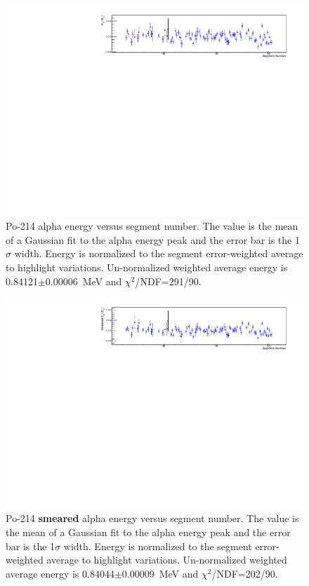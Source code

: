 \begin{figure}[!h]
\centering
\includegraphics[width=1.05\textwidth]{figures/PubBiPo214EvsCell.pdf}
\caption{\label{fig:EvsCell214}Po-214 alpha energy versus segment number. The value is the mean of a Gaussian fit to the alpha energy peak and the error bar is the 1$\sigma$ width. Energy is normalized to the segment error-weighted average to highlight variations. Un-normalized weighted average energy is 0.84121$\pm$0.00006~MeV and $\chi^2$/NDF=291/90.} 
\end{figure}
\begin{figure}[!h]
\centering
\includegraphics[width=1.05\textwidth]{figures/PubBiPo214EsmearvsCell.pdf}
\caption{\label{fig:EsmearvsCell214}Po-214 {\bf smeared} alpha energy versus segment number. The value is the mean of a Gaussian fit to the alpha energy peak and the error bar is the 1$\sigma$ width. Energy is normalized to the segment error-weighted average to highlight variations. Un-normalized weighted average energy is 0.84044$\pm$0.00009~MeV and $\chi^2$/NDF=202/90.} 
\end{figure}
\clearpage
\newpage

